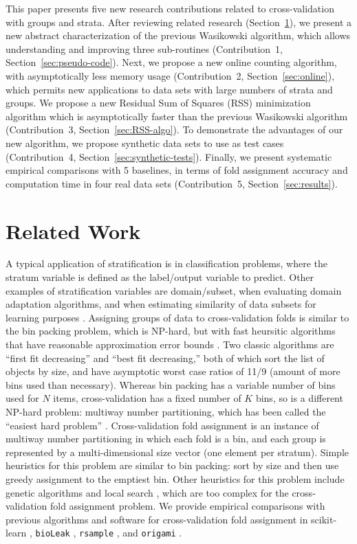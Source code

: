 \documentclass[twoside]{article}
\begin{document}
This paper presents five new research contributions related to cross-validation with groups and strata.
After reviewing related research (Section~\ref{sec:related}), we present a new abstract characterization of the previous Wasikowski algorithm, which allows understanding and improving three sub-routines (Contribution~1, Section~\ref{sec:pseudo-code}).
Next, we propose a new online counting algorithm, with asymptotically less memory usage (Contribution~2, Section~\ref{sec:online}), which permits new applications to data sets with large numbers of strata and groups.
We propose a new Residual Sum of Squares (RSS) minimization algorithm which is asymptotically faster than the previous Wasikowski algorithm (Contribution~3, Section~\ref{sec:RSS-algo}).
To demonstrate the advantages of our new algorithm, we propose synthetic data sets to use as test cases (Contribution~4, Section~\ref{sec:synthetic-tests}).
Finally, we present systematic empirical comparisons with 5 baselines, in terms of fold assignment accuracy and computation time in four real data sets (Contribution~5, Section~\ref{sec:results}).

\section{Related Work}
\label{sec:related}

A typical application of stratification is in classification problems, where the stratum variable is defined as the label/output variable to predict.
Other examples of stratification variables are domain/subset, when evaluating domain adaptation algorithms, and when estimating similarity of data subsets for learning purposes \citep{Hocking2026soak}.
Assigning groups of data to cross-validation folds is similar to the bin packing problem, which is NP-hard, but with fast heursitic algorithms that have reasonable approximation error bounds \citep{Johnson2016}.
Two classic algorithms are ``first fit decreasing'' and ``best fit decreasing,'' both of which sort the list of objects by size, and have asymptotic worst case ratios of 11/9 (amount of more bins used than necessary).
Whereas bin packing has a variable number of bins used for $N$ items, cross-validation has a fixed number of $K$ bins, so is a different NP-hard problem: multiway number partitioning, which has been called the ``easiest hard problem'' \citep{hayes2002computing}.
Cross-validation fold assignment is an instance of multiway number partitioning in which each fold is a bin, and each group is represented by a multi-dimensional size vector (one element per stratum).
Simple heuristics for this problem are similar to bin packing: sort by size and then use greedy assignment to the emptiest bin.
Other heuristics for this problem include genetic algorithms and local search \citet{Pop2013}, which are too complex for the cross-validation fold assignment problem.
We provide empirical comparisons with previous algorithms and software for cross-validation fold assignment in scikit-learn \citep{sklearn2011}, \texttt{bioLeak} \citep{bioLeak2026}, \texttt{rsample} \citep{rsample2026}, and \texttt{origami} \citep{Coyle2018,origami2026}.
\end{document}
